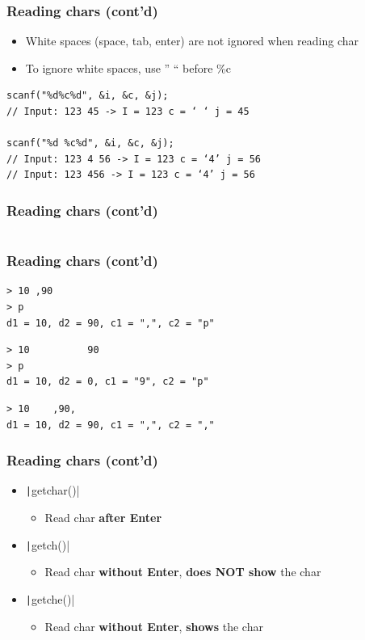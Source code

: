 \documentclass{../c-lecture}
\begin{document}
\begin{frame}[fragile]
  \frametitle{Reading chars (cont’d)}
  \begin{itemize}
    \item White spaces (space, tab, enter) are not ignored when reading char
    \item To ignore white spaces, use '' `` before \%c
  \end{itemize}
  \begin{verbatim}
scanf("%d%c%d", &i, &c, &j);
// Input: 123 45 -> I = 123 c = ‘ ‘ j = 45

scanf("%d %c%d", &i, &c, &j);
// Input: 123 4 56 -> I = 123 c = ‘4’ j = 56
// Input: 123 456 -> I = 123 c = ‘4’ j = 56
  \end{verbatim}
\end{frame}

\begin{frame}[fragile]
  \frametitle{Reading chars (cont’d)}
  \inputminted[bgcolor=Black]{c}{./src/read-with-whitespaces.c}
\end{frame}

\begin{frame}[fragile]
  \frametitle{Reading chars (cont’d)}
  \begin{verbatim}
> 10 ,90
> p
d1 = 10, d2 = 90, c1 = ",", c2 = "p"
  \end{verbatim}
  \begin{verbatim}
> 10          90
> p
d1 = 10, d2 = 0, c1 = "9", c2 = "p"
  \end{verbatim}
  \begin{verbatim}
> 10    ,90,
d1 = 10, d2 = 90, c1 = ",", c2 = ","
  \end{verbatim}
\end{frame}

\begin{frame}
  \frametitle{Reading chars (cont’d)}
  \begin{itemize}
    \item \texttt|getchar()|
    \begin{itemize}
      \item Read char \textbf{\color{Orange} after Enter}
    \end{itemize}
    \item \texttt|getch()|
    \begin{itemize}
      \item
        Read char \textbf{\color{Orange} without Enter},
        \textbf{\color{LimeGreen} does NOT show} the char
    \end{itemize}
    \item \texttt|getche()|
    \begin{itemize}
      \item
        Read char \textbf{\color{Orange} without Enter},
        \textbf{\color{LimeGreen} shows} the char
    \end{itemize}
  \end{itemize}
\end{frame}
\end{document}
